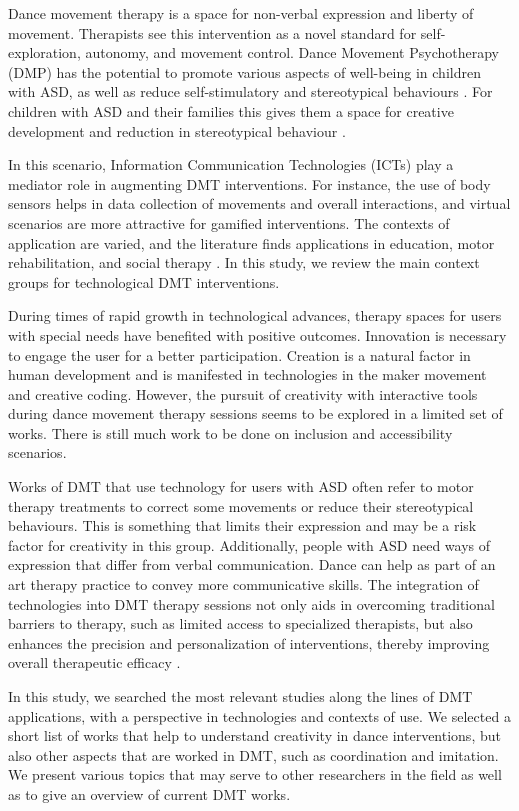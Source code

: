 \documentclass[a4paper,fleqn]{cas-sc}
\begin{document}
Dance movement therapy is a space for non-verbal expression and liberty of movement. Therapists see this intervention as a novel standard for self-exploration, autonomy, and movement control.  Dance Movement Psychotherapy (DMP) has the potential to promote various aspects of well-being in children with ASD, as well as reduce self-stimulatory and stereotypical behaviours  \cite{Aithal2021} . For children with ASD and their families this gives them a space for creative development and reduction in stereotypical behaviour \cite{Ziadat22}.

In this scenario, Information Communication Technologies (ICTs) play a mediator role in augmenting DMT interventions. For instance, the use of body sensors helps in data collection of movements and overall interactions, and virtual scenarios are more attractive for gamified interventions. The contexts of application are varied, and the literature finds applications in education, motor rehabilitation, and social therapy \cite{Srinivasan2013}.  In this study, we review the main context groups for technological DMT interventions.

During times of rapid growth in technological advances, therapy spaces for users with special needs have benefited with positive outcomes. Innovation is necessary to engage the user for a better participation. Creation is a natural factor in human development and is manifested in technologies in the maker movement and creative coding. However, the pursuit of creativity with interactive tools during dance movement therapy sessions seems to be explored in a limited set of works. There is still much work to be done on inclusion and accessibility scenarios.

Works of DMT that use technology for users with ASD often refer to motor therapy treatments to correct some movements or reduce their stereotypical behaviours. This is something that limits their expression and may be a risk factor for creativity in this group. Additionally, people with ASD need ways of expression that differ from verbal communication. Dance can help as part of an art therapy practice to convey more communicative skills. The integration of technologies into DMT therapy sessions not only aids in overcoming traditional barriers to therapy, such as limited access to specialized therapists, but also enhances the precision and personalization of interventions, thereby improving overall therapeutic efficacy \cite{Kientz2013}.


In  this study, we searched the most relevant studies along the lines of DMT applications, with a perspective in technologies and contexts of use. We selected a short list of works that help to understand creativity in dance interventions, but also other aspects that are worked in DMT, such as coordination and imitation. We present various topics that may serve to other researchers in the field as well as to give an overview of current DMT works.
\end{document}
